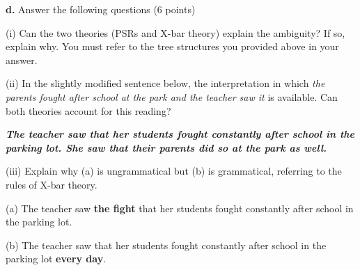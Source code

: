 \documentclass{article}
\begin{document}
\newpage
\noindent \textbf{d.} Answer the following questions (6 points) \par
\bigskip \noindent (i) Can the two theories (PSRs and X-bar theory) explain the ambiguity? If so, explain why. You must refer to the tree structures you provided above in your answer. \par
\vspace{1.5cm}
\noindent (ii) In the slightly modified sentence below, the interpretation in which \textit{the parents fought after school at the park and the teacher saw it} is available. Can both theories account for this reading? \par
\medskip \noindent \textbf{\textit{The teacher saw that her students fought constantly after school in the parking lot. She saw that their parents did so at the park as well.}}\par
\vspace{1.5cm}
\noindent (iii) Explain why (a) is ungrammatical but (b) is grammatical, referring to the rules of X-bar theory.\par
\medskip \noindent (a) \*The teacher saw \textbf{the fight} that her students fought constantly after school in the parking lot.\par
\medskip \noindent (b) The teacher saw that her students fought constantly after school in the parking lot \textbf{every day}.

\newpage
\end{document}
